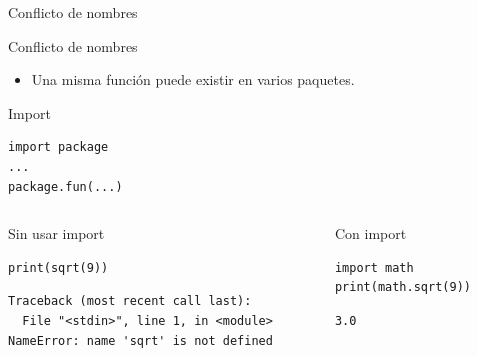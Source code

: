\documentclass[bigger,unknownkeysallowed]{beamer}
\begin{document}
\begin{frame}[fragile,label={sec:orgaa54847}]{Conflicto de nombres}
 \begin{block}{Conflicto de nombres}
\begin{itemize}
\item Una misma función puede existir en varios paquetes.
\end{itemize}
\end{block}


\begin{block}{Import}
\begin{verbatim}
import package
...
package.fun(...)
\end{verbatim}
\end{block}

\begin{columns}
\begin{column}{0.6\columnwidth}
\begin{exampleblock}{Sin usar import}
\begin{verbatim}
print(sqrt(9))
\end{verbatim}
\scriptsize
\begin{verbatim}
Traceback (most recent call last):
  File "<stdin>", line 1, in <module>
NameError: name 'sqrt' is not defined
\end{verbatim}
\end{exampleblock}
\end{column}

\begin{column}{0.4\columnwidth}
\begin{exampleblock}{Con import}
\begin{verbatim}
import math
print(math.sqrt(9))
\end{verbatim}
\scriptsize
\begin{verbatim}
3.0
\end{verbatim}
\end{exampleblock}
\end{column}
\end{columns}
\end{frame}
\end{document}
